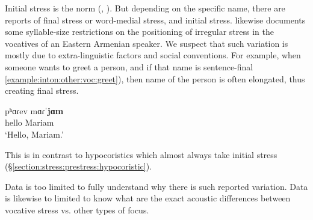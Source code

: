 Initial stress is the norm (\citealt[336,338]{Adjarian-1971-LiakatarPhono}, \citealt[76]{Margaryan-1997-ArmenianPhonology}). But depending on the specific name, there are reports of final stress or word-medial stress, and initial stress. \citet[17]{Johnson-1954-EastArmGrammar} likewise documents some syllable-size restrictions on the positioning of irregular stress in the vocatives of an Eastern Armenian speaker. We suspect that such variation is mostly due to extra-linguistic factors and social conventions. For example, when someone wants to greet a person, and if that name is sentence-final  \ref{example:inton:other:voc:greet}), then   name of the person is often elongated, thus creating final stress. 

\begin{exe}
	\ex \gll pʰɑɾev mɑɾˈ\textbf{jɑm} \\
	hello Mariam \\
	\trans `Hello, Mariam.' 
	\label{example:inton:other:voc:greet}
	\\ 
\end{exe}

This is in contrast to hypocoristics which almost always take initial stress (\S\ref{section:stress:prestress:hypocoristic}). 


Data is too limited to fully understand why there is such reported variation. Data is likewise to limited to know what are the exact acoustic differences between vocative stress vs. other types of focus. 

